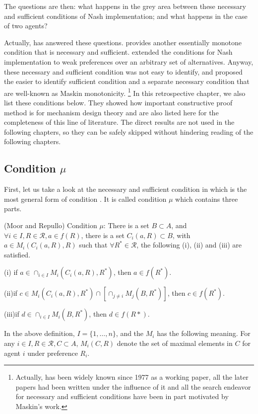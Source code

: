 The questions  are then:  what happens  in  the  grey  area  between
these  necessary and sufficient conditions of Nash implementation; and
what  happens  in the case  of two  agents? 


Actually, \parencite{Repullo90} has answered these questions.
\parencite{Danilov1992} provides another essentially monotone condition
that is  necessary and sufficient. \parencite{Yamato1992} extended the
\parencite{Danilov1992}  conditions for Nash implementation to weak
preferences over an arbitrary set of alternatives. Anyway,
these necessary  and sufficient  condition was not easy to identify,
and  \parencite{Maskin1999} proposed the easier to identify
sufficient condition and a separate necessary condition that are
well-known as Maskin monotonicity. \footnote{ Actually,  \parencite{Maskin1999} has been
widely known since 1977 as a working paper,  all the later papers
 had been written under the influence of it and all the search endeavor for necessary and
sufficient conditions have been in part motivated by Maskin's work.} In this retrospective
chapter, we also list these conditions below. They showed how important constructive proof method is
for mechanism design theory and are also listed here for the completeness of this line of literature. The direct results are not used in
the following chapters, so they can be safely skipped without hindering reading of the following chapters.

\subsection{Condition $\mu$}

First, let us take a look at the necessary and sufficient condition
in \parencite{Repullo90} which is the most general form of condition
. It is called condition $\mu$ which contains three parts.
\begin{definition*}(Moor and Repullo)
  Condition $\mu$: There is a set $B \subset A$, and $\forall i \in I,
  R\in\mathscr{R}, a \in f(R)$, there is a set $C_{i}(a, R) \subset
  B$, with $a \in M_{i}(C_{i}(a,R),R)$ such that $\forall R^* \in
  \mathscr{R}$, the following (i), (ii) and (iii) are satisfied.

(i) if $a \in \cap_{i \in I} M_i(C_i(a, R),R^*)$, then $ a \in f(R^*)$.

(ii)if $c \in M_i(C_i(a, R), R^*) \cap [ \cap_{j \not = i} M_j(B, R^*)]$, then $c \in f(R^*)$.

(iii)if $d \in \cap_{i\in I} M_i(B, R^*)$, then $d \in f(R*)$. 

\end{definition*}
In the above definition, $I= \{1,\dots,n\}$, and the $M_{i}$ has the following meaning. For
any $i \in I, R \in \mathscr{R}, C \subset A$, $M_{i}(C, R)$ denote
the set  of maximal  elements  in $C$ for  agent  $i$  under  preference $R_{i}$.

